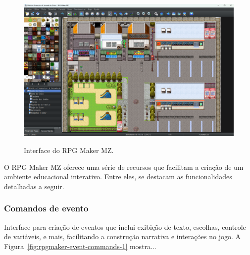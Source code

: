 \begin{figure}[ht]
	\centering
	\caption{Interface do RPG Maker MZ.}
	\includegraphics[scale=0.3]{Textuais/Pictures/RPGMaker_Interface.png}
	\label{fig:rpgmaker-interface}
\end{figure}


O RPG Maker MZ oferece uma série de recursos que facilitam a criação de um ambiente educacional interativo. Entre eles, se destacam as funcionalidades detalhadas a seguir.


\subsubsection*{Comandos de evento}
Interface para criação de eventos que inclui exibição de texto, escolhas, controle de variáveis, e mais, facilitando a construção narrativa e interações no jogo. A Figura~\ref{fig:rpgmaker-event-commands-1} mostra...

